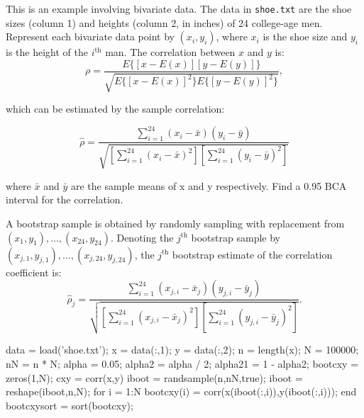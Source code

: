 \begin{labwork}
This is an example involving bivariate data. The data in {\tt shoe.txt} are the shoe sizes (column 1) and heights (column 2, in inches) of 24 college-age men.
Represent each bivariate data point by $(x_i,y_i)$, where $x_i$ is the shoe size and $y_i$ is the height of the $i^{\textrm{th}}$ man. The correlation between $x$ and $y$ is:
$$\rho=\frac{E\{[x-E(x)][y-E(y)]\}}{\sqrt{E\{[x-E(x)]^2\}E\{[y-E(y)]^2\}}},$$

which can be estimated by the sample correlation:

$$\hat{\rho}=\frac{\sum_{i=1}^{24}(x_i-\bar{x})(y_i-\bar{y})}{\sqrt{[\sum^{24}_{i=1}(x_i-\bar{x})^2][\sum^{24}_{i=1}(y_i-\bar{y})^2]}}$$

where $\bar{x}$ and $\bar{y}$ are the sample means of x and y respectively. Find a 0.95 BCA interval for the correlation.

A bootstrap sample is obtained by randomly sampling with replacement from $(x_1,y_1),\ldots,(x_{24},y_{24})$. Denoting the $j^{\textrm{th}}$ bootstrap sample by $(x_{j,1},y_{j,1}),\ldots,(x_{j,24},y_{j,24})$, the $j^{\textrm{th}}$ bootstrap estimate of the correlation coefficient is:
$$\hat{\rho}_j=\frac{\sum_{i=1}^{24}(x_{j,i}-\bar{x}_j)(y_{j,i}-\bar{y}_j)}{\sqrt{[\sum^{24}_{i=1}(x_{j,i}-\bar{x}_j)^2][\sum^{24}_{i=1}(y_{j,i}-\bar{y}_j)^2]}}.$$

\begin{VrbM}
data = load('shoe.txt'); %
x = data(:,1); %
y = data(:,2); %
n = length(x); %
N = 100000; %
nN = n * N;
alpha = 0.05;
alpha2 = alpha / 2;
alpha21 = 1 - alpha2;
bootcxy = zeros(1,N); %
cxy = corr(x,y) %
iboot = randsample(n,nN,true); %
iboot = reshape(iboot,n,N); %
for i = 1:N
    bootcxy(i) = corr(x(iboot(:,i)),y(iboot(:,i))); %
end
bootcxysort = sort(bootcxy); %


\end{VrbM}
\end{labwork}
